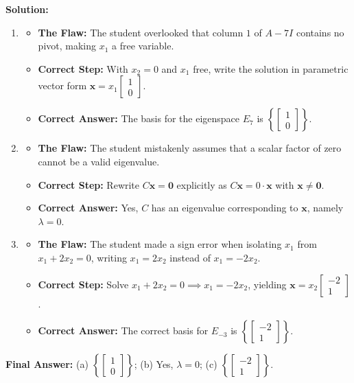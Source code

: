 \documentclass[11pt, letterpaper]{article}
\theoremstyle{definition}
\theoremstyle{remark}
\begin{document}
\textbf{Solution:}
\begin{enumerate}[label=(\alph*)]
    \item \begin{itemize}
        \item \textbf{The Flaw:} The student overlooked that column $1$ of $A - 7I$ contains no pivot, making $x_1$ a free variable.
        \item \textbf{Correct Step:} With $x_2 = 0$ and $x_1$ free, write the solution in parametric vector form $\mathbf{x} = x_1 \begin{bmatrix} 1 \\ 0 \end{bmatrix}$.
        \item \textbf{Correct Answer:} The basis for the eigenspace $E_7$ is $\left\{ \begin{bmatrix} 1 \\ 0 \end{bmatrix} \right\}$.
    \end{itemize}
    \item \begin{itemize}
        \item \textbf{The Flaw:} The student mistakenly assumes that a scalar factor of zero cannot be a valid eigenvalue.
        \item \textbf{Correct Step:} Rewrite $C\mathbf{x} = \mathbf{0}$ explicitly as $C\mathbf{x} = 0 \cdot \mathbf{x}$ with $\mathbf{x} \neq \mathbf{0}$.
        \item \textbf{Correct Answer:} Yes, $C$ has an eigenvalue corresponding to $\mathbf{x}$, namely $\lambda = 0$.
    \end{itemize}
    \item \begin{itemize}
        \item \textbf{The Flaw:} The student made a sign error when isolating $x_1$ from $x_1 + 2x_2 = 0$, writing $x_1 = 2x_2$ instead of $x_1 = -2x_2$.
        \item \textbf{Correct Step:} Solve $x_1 + 2x_2 = 0 \implies x_1 = -2x_2$, yielding $\mathbf{x} = x_2 \begin{bmatrix} -2 \\ 1 \end{bmatrix}$.
        \item \textbf{Correct Answer:} The correct basis for $E_{-3}$ is $\left\{ \begin{bmatrix} -2 \\ 1 \end{bmatrix} \right\}$.
    \end{itemize}
\end{enumerate}
\textbf{Final Answer:} (a) $\left\{ \begin{bmatrix} 1 \\ 0 \end{bmatrix} \right\}$; (b) Yes, $\lambda = 0$; (c) $\left\{ \begin{bmatrix} -2 \\ 1 \end{bmatrix} \right\}$.
\end{document}
